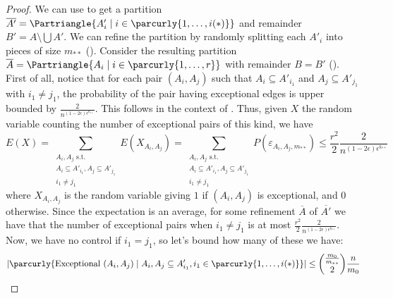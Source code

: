 \begin{lemma}[Claim 4.14]
\begin{enumerate}
        \end{enumerate}
        \begin{proof}
            We can use  to get a partition
            $\overline{A'} = \Partriangle{A'_i \mid i \in \parcurly{1, \dots, i(*)}}$ and remainder $B' = A \setminus \bigcup A'$.
            We can refine the partition by randomly splitting each $A'_i$ into pieces of size $m_{**}$ ().
            Consider the resulting partition $\overline{A} = \Partriangle{A_i \mid i \in \parcurly{1, \dots, r}}$ with remainder $B = B'$
            ().
            First of all, notice that for each pair $(A_i, A_j)$ such that $A_i \subseteq A'_{i_1}$ and
            $A_j \subseteq A'_{j_1}$ with $i_1 \neq j_1$, the probability of the pair having exceptional edges is
            upper bounded by $\frac{2}{n^{(1-2\epsilon)\epsilon^{k_{**}}}}$.
            This follows  in the context of
            .
            Thus, given $X$ the random variable counting the number of exceptional pairs of this kind, we have
            \[
                E(X) = \sum_{\substack{A_i,A_j \text{ s.t.}\\A_i\subseteq A'_{i_1},A_j\subseteq A'_{j_1}\\i_1\neq j_1}} E(X_{A_i, A_j})
                     = \sum_{\substack{A_i,A_j \text{ s.t.}\\A_i\subseteq A'_{i_1},A_j\subseteq A'_{j_1}\\i_1\neq j_1}} P(\varepsilon_{A_i, A_j,m_{**}})
                     \leq \frac{r^2}{2} \frac{2}{n^{(1-2\epsilon)\epsilon^{k_{**}}}}
            \]
            where $X_{A_i,A_j}$ is the random variable giving $1$ if $(A_i, A_j)$ is exceptional, and $0$ otherwise.
            Since the expectation is an average, for some refinement $\overline{A}$ of $\overline{A'}$ we have that
            the number of exceptional pairs when $i_1 \neq j_1$ is at most $\frac{r^2}{2} \frac{2}{n^{(1-2\epsilon)\epsilon^{k_{**}}}}$.
            Now, we have no control if $i_1 = j_1$, so let's bound how many of these we have:
            \[
                \begin{split}
                    |\parcurly{\text{Exceptional } (A_i, A_j) \mid A_i, A_j \subseteq A'_{i_1}, i_1 \in \parcurly{1, \dots, i(*)}}|
                        & \leq {\frac{m_0}{m_{**}} \choose 2} \frac{n}{m_0} \\

\end{split}\]
\end{proof}
\end{lemma}

